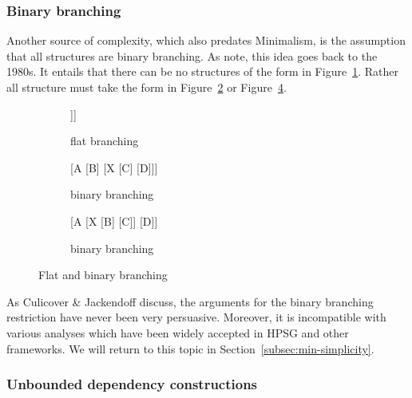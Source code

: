 \documentclass[output=paper
 	        ,biblatex
                ,babelshorthands
                ,newtxmath
                ,draftmode
                ,colorlinks, citecolor=brown
]{langscibook}
\begin{document}
\subsubsection{Binary branching}

Another source of complexity, which also predates Minimalism, is the assumption that
all structures are binary branching. As  \citet[112--116]{CJ2005a} note, this idea goes back to the
1980s. It entails that there can be no structures of the form in
Figure~\ref{fig:min-trinary}. Rather all structure must take the form in
Figure~\ref{fig:min-binary-a} or Figure~\ref{fig:min-binary-b}.
\begin{figure}
\hfill
\begin{subfigure}[t]{0.3\textwidth}
\centering
	\begin{forest} %
		[A
		[B][C][D [\vphantom{E},no edge]]]
	\end{forest}
\vfill
	\caption{\label{fig:min-trinary}flat branching}
\end{subfigure}
\hfill
\begin{subfigure}[t]{0.3\textwidth}
\centering
	\begin{forest} %
		[A
		  [B]
		  [X 
                    [C] 
                    [D]]]
	\end{forest}
	\caption{\label{fig:min-binary-a}binary branching}
\end{subfigure}
\hfill
\begin{subfigure}[t]{0.3\textwidth}
\centering
	\begin{forest} %
		[A
		  [X 
                    [B]
                    [C]]
		  [D]]
	\end{forest}
	\caption{\label{fig:min-binary-b}binary branching}
\end{subfigure}
\hfill\mbox{}
\caption{Flat and binary branching}
\end{figure}
%
As Culicover \& Jackendoff discuss, the arguments for the binary branching restriction have never
been very persuasive. Moreover, it is incompatible with various analyses which have been widely
accepted in HPSG and other frameworks. We will return to this topic in
Section~\ref{subsec:min-simplicity}. 


\subsubsection{Unbounded dependency constructions}
\label{minimalism-sec-empty-elements-for-relative-clauses}
\end{document}
